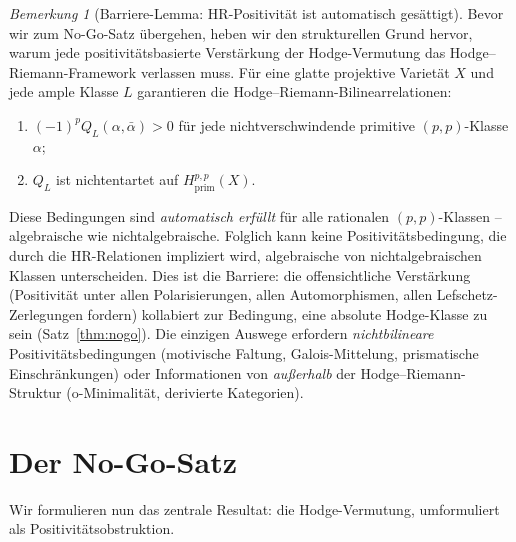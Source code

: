 \documentclass[aps,prd,twocolumn,superscriptaddress,nofootinbib]{revtex4-2}
\theoremstyle{definition}
\theoremstyle{remark}
\newtheorem{remark}[theorem]{Bemerkung}
\begin{document}
\begin{remark}[Barriere-Lemma: HR-Positivität ist automatisch gesättigt]
\label{rem:barrier-lemma}
Bevor wir zum No-Go-Satz übergehen, heben wir den strukturellen Grund hervor, warum jede positivitätsbasierte Verstärkung der Hodge-Vermutung das Hodge--Riemann-Framework verlassen muss. Für eine glatte projektive Varietät $X$ und jede ample Klasse $L$ garantieren die Hodge--Riemann-Bilinearrelationen:
\begin{enumerate}
\item $(-1)^p Q_L(\alpha, \bar{\alpha}) > 0$ für jede nichtverschwindende primitive $(p,p)$-Klasse $\alpha$;
\item $Q_L$ ist nichtentartet auf $H^{p,p}_{\mathrm{prim}}(X)$.
\end{enumerate}
Diese Bedingungen sind \emph{automatisch erfüllt} für alle rationalen $(p,p)$-Klassen -- algebraische wie nichtalgebraische. Folglich kann keine Positivitätsbedingung, die durch die HR-Relationen impliziert wird, algebraische von nichtalgebraischen Klassen unterscheiden. Dies ist die Barriere: die \glqq offensichtliche\grqq{} Verstärkung (Positivität unter allen Polarisierungen, allen Automorphismen, allen Lefschetz-Zerlegungen fordern) kollabiert zur Bedingung, eine absolute Hodge-Klasse zu sein (Satz~\ref{thm:nogo}). Die einzigen Auswege erfordern \emph{nichtbilineare} Positivitätsbedingungen (motivische Faltung, Galois-Mittelung, prismatische Einschränkungen) oder Informationen von \emph{außerhalb} der Hodge--Riemann-Struktur (o-Minimalität, derivierte Kategorien).
\end{remark}

\section{Der No-Go-Satz}
\label{sec:nogo}

Wir formulieren nun das zentrale Resultat: die Hodge-Vermutung, umformuliert als Positivitätsobstruktion.
\end{document}
